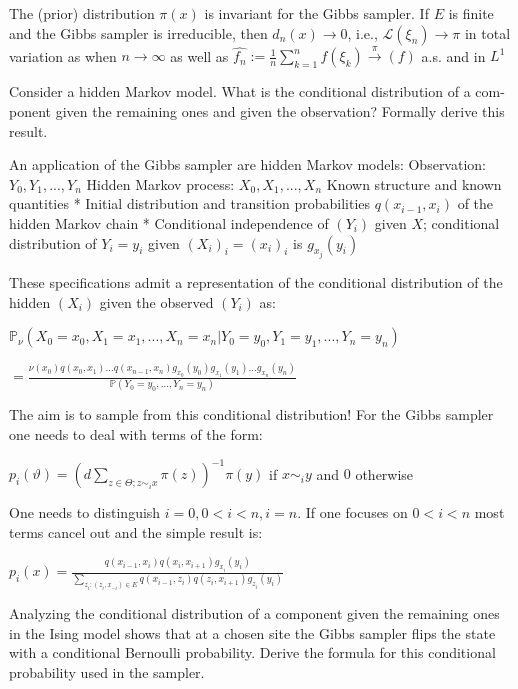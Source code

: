The (prior) distribution \(\pi(x)\) is invariant for the Gibbs sampler.
If \(E\) is finite and the Gibbs sampler is irreducible, then \(d_{n}(x)\rightarrow0\), i.e.,
\(\mathcal{L}(\xi_{n}) \rightarrow \pi\)
in total variation as when \( n \to \infty \) as well as
\(\hat{f_{n}} := \frac{1}{n}\sum_{k=1}^{n} f(\xi_{k}) \xrightarrow \pi(f)\)
a.s. and in \( L^{1} \)


Consider a hidden Markov model. What is the conditional distribution of a com-
ponent given the remaining ones and given the observation? Formally derive this
result.

An application of the Gibbs sampler are hidden Markov models:
Observation: \(Y_{0}, Y_{1}, ..., Y_{n}\)
Hidden Markov process: 
\(X_{0}, X_{1}, ..., X_{n}\)
Known structure and known quantities
* Initial distribution and transition probabilities \(q(x_{i-1}, x_{i})\) of the hidden Markov chain
* Conditional independence of \((Y_{i})\) given \(X\); conditional distribution of \(Y_{i} = y_{i}\) given \((X_{i})_{i} = (x_{i})_{i}\) is \(g_{x_{j}}(y_{i})\)

These specifications admit a representation of the conditional distribution of the hidden \((X_{i})\) given the observed \((Y_{i})\) as:

\( \mathbb{P}_{\nu}(X_{0} = x_{0}, X_{1} = x_{1}, ..., X_{n} = x_{n} | Y_{0} = y_{0}, Y_{1} = y_{1}, ..., Y_{n} = y_{n}) \)

\( = \frac{\nu(x_0) q(x_0, x_1) \dots q(x_{n-1}, x_n) g_{x_0}(y_0) g_{x_1}(y_1) \dots g_{x_n}(y_n)}{\mathbb{P}(Y_0 = y_0, ..., Y_n = y_n)} \)

The aim is to sample from this conditional distribution!
For the Gibbs sampler one needs to deal with terms of the form:

\( p_i(\vartheta) = (d\sum_{z \in \Theta; z \sim_i x} \pi(z))^{-1}\pi(y) \) if \( x \sim_i y \) and \( 0 \) otherwise

One needs to distinguish \(i = 0, 0 < i < n, i = n\). If one focuses on \(0 < i < n\) most terms cancel out and the simple result is:

\(p_i(x) = \frac{q(x_{i-1}, x_{i}) q(x_{i}, x_{i+1}) g_{x_{i}}(y_{i})}{\sum_{z_{i} : (z_{i}, x_{-i}) \in E} q(x_{i-1}, z_{i}) q(z_{i}, x_{i+1}) g_{z_{i}}(y_{i})}\)

Analyzing the conditional distribution of a component given the remaining ones
in the Ising model shows that at a chosen site the Gibbs sampler flips the state
with a conditional Bernoulli probability. Derive the formula for this conditional
probability used in the sampler.

